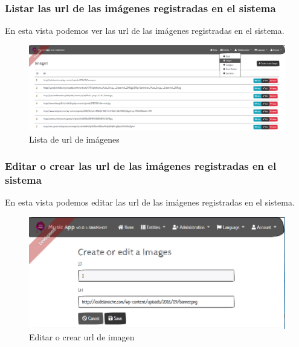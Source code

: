 \subsubsection{Listar las url de las imágenes registradas en el sistema}
En esta vista podemos ver las url de las imágenes registradas en el sistema.
\begin{figure}[h!]
 \centering
\includegraphics[width=\linewidth]{Desarrollo/Interfaces/Interfaces/imgs/ImagesList.PNG}
\caption{Lista de url de imágenes}
\end{figure}



\subsubsection{Editar o crear las url de las imágenes registradas en el sistema}
En esta vista podemos editar las url de las imágenes registradas en el sistema.
\begin{figure}[h!]
 \centering
\includegraphics[width=0.8\linewidth]{Desarrollo/Interfaces/Interfaces/imgs/ImagesEdit.PNG}
\caption{Editar o crear url de imagen}
\end{figure}

\newpage

